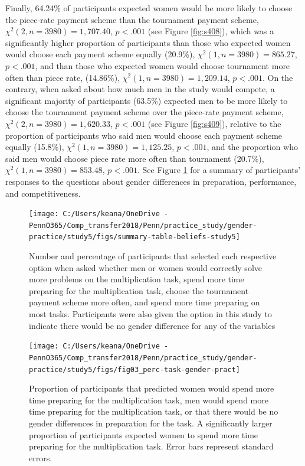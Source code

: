 \documentclass[a4paper, nobind]{templates/ociamthesis}
\begin{document}
Finally, 64.24\% of participants expected women would be more likely to choose the piece-rate payment scheme than the tournament payment scheme, \(\chi^2(2, n = 3980) = 1,707.40\), \(p < .001\) (see Figure \ref{fig:s408}), which was a significantly higher proportion of participants than those who expected women would choose each payment scheme equally (20.9\%), \(\chi^2(1, n = 3980) = 865.27\), \(p < .001\), and than those who expected women would choose tournament more often than piece rate, (14.86\%), \(\chi^2(1, n = 3980) = 1,209.14\), \(p < .001\). On the contrary, when asked about how much men in the study would compete, a significant majority of participants (63.5\%) expected men to be more likely to choose the tournament payment scheme over the piece-rate payment scheme, \(\chi^2(2, n = 3980) = 1,620.33\), \(p < .001\) (see Figure \ref{fig:s409}), relative to the proportion of participants who said men would choose each payment scheme equally (15.8\%), \(\chi^2(1, n = 3980) = 1,125.25\), \(p < .001\), and the proportion who said men would choose piece rate more often than tournament (20.7\%), \(\chi^2(1, n = 3980) = 853.48\), \(p < .001\). See Figure \ref{fig:summary-table-beliefs-study5} for a summary of participants' responses to the questions about gender differences in preparation, performance, and competitiveness.

\begin{figure}

{\centering \texttt{[image: C:/Users/keana/OneDrive - PennO365/Comp\_transfer2018/Penn/practice\_study/gender-practice/study5/figs/summary-table-beliefs-study5]} 

}

\caption{Number and percentage of participants that selected each respective option when asked whether men or women would correctly solve more problems on the multiplication task, spend more time preparing for the multiplication task, choose the tournament payment scheme more often, and spend more time preparing on most tasks. Participants were also given the option in this study to indicate there would be no gender difference for any of the variables}\label{fig:summary-table-beliefs-study5}
\end{figure}

\begin{figure}

{\centering \texttt{[image: C:/Users/keana/OneDrive - PennO365/Comp\_transfer2018/Penn/practice\_study/gender-practice/study5/figs/fig03\_perc-task-gender-pract]} 

}

\caption{Proportion of participants that predicted women would spend more time preparing for the multiplication task, men would spend more time preparing for the multiplication task, or that there would be no gender differences in preparation for the task. A significantly larger proportion of participants expected women to spend more time preparing for the multiplication task. Error bars represent standard errors.}\label{fig:s403}
\end{figure}
\end{document}
